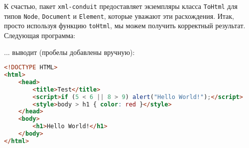 К счастью, пакет \lstinline!xml-conduit! предоставляет экземпляры класса \lstinline!ToHtml! для типов \lstinline!Node!, \lstinline!Document! и \lstinline!Element!, которые уважают эти расхождения. Итак, просто используя функцию \lstinline!toHtml!, мы можем получить корректный результат. Следующая программа:



... выводит (пробелы добавлены вручную):

\begin{lstlisting}[language=HTML]
<!DOCTYPE HTML>
<html>
    <head>
        <title>Test</title>
        <script>if (5 < 6 || 8 > 9) alert("Hello World!");</script>
        <style>body > h1 { color: red }</style>
    </head>
    <body>
        <h1>Hello World!</h1>
    </body>
</html>
\end{lstlisting}%
